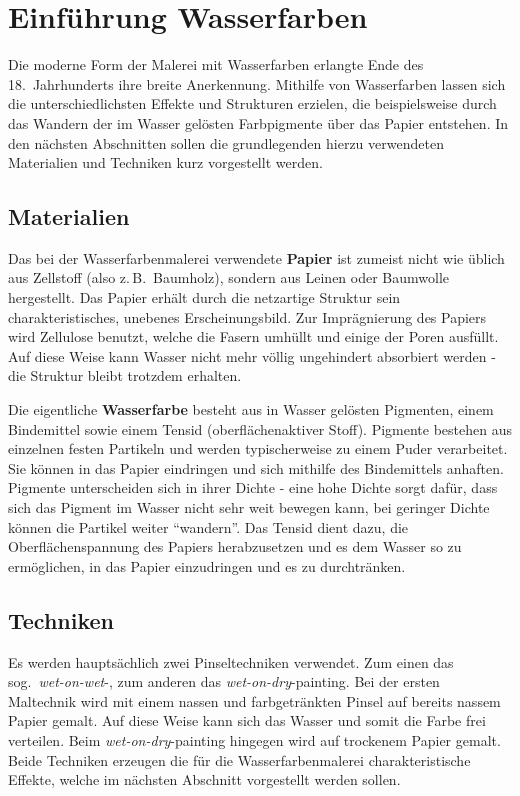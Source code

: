 \section{Einführung Wasserfarben}
Die moderne Form der Malerei mit Wasserfarben erlangte Ende des 18.\ 
Jahrhunderts ihre breite Anerkennung. Mithilfe von Wasserfarben lassen sich die 
unterschiedlichsten Effekte und Strukturen erzielen, die beispielsweise durch 
das Wandern der im Wasser gelösten Farbpigmente über das Papier entstehen. In 
den nächsten Abschnitten sollen die grundlegenden hierzu verwendeten 
Materialien und Techniken kurz vorgestellt werden.

\subsection{Materialien}
Das bei der Wasserfarbenmalerei verwendete \textbf{Papier} ist zumeist nicht 
wie üblich aus Zellstoff (also z.\,B.\ Baumholz), sondern aus Leinen oder 
Baumwolle hergestellt. Das Papier erhält durch die netzartige Struktur sein 
charakteristisches, unebenes Erscheinungsbild. Zur Imprägnierung des Papiers 
wird Zellulose benutzt, welche die Fasern umhüllt und einige der Poren 
ausfüllt. Auf diese Weise kann Wasser nicht mehr völlig ungehindert absorbiert 
werden - die Struktur bleibt trotzdem erhalten.

Die eigentliche \textbf{Wasserfarbe} besteht aus in Wasser gelösten Pigmenten,
einem Bindemittel sowie einem Tensid (oberflächenaktiver Stoff). Pigmente
bestehen aus einzelnen festen Partikeln und werden typischerweise zu einem Puder
verarbeitet. Sie können in das Papier eindringen und sich mithilfe des
Bindemittels anhaften. Pigmente unterscheiden sich in ihrer Dichte - eine hohe
Dichte sorgt dafür, dass sich das Pigment im Wasser nicht sehr weit bewegen
kann, bei geringer Dichte können die Partikel weiter "`wandern"'.
Das Tensid dient dazu, die Oberflächenspannung des Papiers herabzusetzen und es
dem Wasser so zu ermöglichen, in das Papier einzudringen und es zu durchtränken.

\subsection{Techniken}
Es werden hauptsächlich zwei Pinseltechniken verwendet. Zum einen das sog.\ 
\textsl{wet-on-wet}-, zum anderen das \textsl{wet-on-dry}-painting. Bei der
ersten Maltechnik wird mit einem nassen und farbgetränkten Pinsel auf bereits
nassem Papier gemalt. Auf diese Weise kann sich das Wasser und somit die Farbe
frei verteilen. Beim \textsl{wet-on-dry}-painting hingegen wird auf trockenem
Papier gemalt. Beide Techniken erzeugen die für die Wasserfarbenmalerei
charakteristische Effekte, welche im nächsten Abschnitt vorgestellt werden
sollen.

